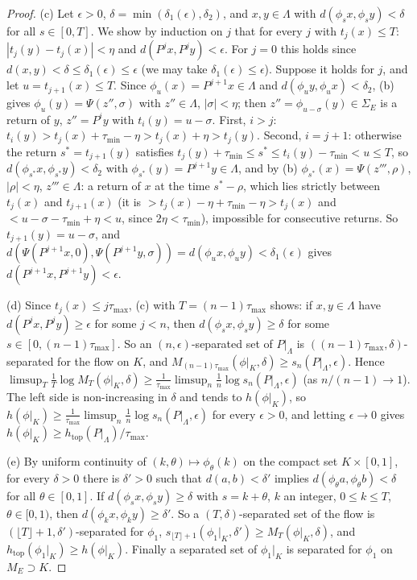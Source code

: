 \documentclass[11pt]{article}
\theoremstyle{definition}
\newcommand{\htop}{h_{\mathrm{top}}}
\begin{document}
\begin{proof}
(c) Let $\epsilon > 0$, $\delta = \min(\delta_1(\epsilon), \delta_2)$, and $x, y \in \Lambda$ with $d(\phi_sx, \phi_sy) < \delta$ for all $s \in [0, T]$. We show by induction on $j$ that for every $j$ with $t_j(x) \le T$: $|t_j(y) - t_j(x)| < \eta$ and $d(P^jx, P^jy) < \epsilon$. For $j = 0$ this holds since $d(x, y) < \delta \le \delta_1(\epsilon) \le \epsilon$ (we may take $\delta_1(\epsilon) \le \epsilon$). Suppose it holds for $j$, and let $u = t_{j+1}(x) \le T$. Since $\phi_u(x) = P^{j+1}x \in \Lambda$ and $d(\phi_uy, \phi_ux) < \delta_2$, (b) gives $\phi_u(y) = \Psi(z'', \sigma)$ with $z'' \in \Lambda$, $|\sigma| < \eta$; then $z'' = \phi_{u - \sigma}(y) \in \Sigma_E$ is a return of $y$, $z'' = P^iy$ with $t_i(y) = u - \sigma$. First, $i > j$: $t_i(y) > t_j(x) + \tau_{\min} - \eta > t_j(x) + \eta > t_j(y)$. Second, $i = j + 1$: otherwise the return $s^* = t_{j+1}(y)$ satisfies $t_j(y) + \tau_{\min} \le s^* \le t_i(y) - \tau_{\min} < u \le T$, so $d(\phi_{s^*}x, \phi_{s^*}y) < \delta_2$ with $\phi_{s^*}(y) = P^{j+1}y \in \Lambda$, and by (b) $\phi_{s^*}(x) = \Psi(z''', \rho)$, $|\rho| < \eta$, $z''' \in \Lambda$: a return of $x$ at the time $s^* - \rho$, which lies strictly between $t_j(x)$ and $t_{j+1}(x)$ (it is $> t_j(x) - \eta + \tau_{\min} - \eta > t_j(x)$ and $< u - \sigma - \tau_{\min} + \eta < u$, since $2\eta < \tau_{\min}$), impossible for consecutive returns. So $t_{j+1}(y) = u - \sigma$, and $d(\Psi(P^{j+1}x, 0), \Psi(P^{j+1}y, \sigma)) = d(\phi_ux, \phi_uy) < \delta_1(\epsilon)$ gives $d(P^{j+1}x, P^{j+1}y) < \epsilon$.

(d) Since $t_j(x) \le j\tau_{\max}$, (c) with $T = (n - 1)\tau_{\max}$ shows: if $x, y \in \Lambda$ have $d(P^jx, P^jy) \ge \epsilon$ for some $j < n$, then $d(\phi_sx, \phi_sy) \ge \delta$ for some $s \in [0, (n-1)\tau_{\max}]$. So an $(n, \epsilon)$-separated set of $P|_\Lambda$ is $((n-1)\tau_{\max}, \delta)$-separated for the flow on $K$, and $M_{(n-1)\tau_{\max}}(\phi|_K, \delta) \ge s_n(P|_\Lambda, \epsilon)$. Hence $\limsup_T\frac1T\log M_T(\phi|_K, \delta) \ge \frac{1}{\tau_{\max}}\limsup_n\frac1n\log s_n(P|_\Lambda, \epsilon)$ (as $n/(n-1) \to 1$). The left side is non-increasing in $\delta$ and tends to $h(\phi|_K)$, so $h(\phi|_K) \ge \frac{1}{\tau_{\max}}\limsup_n\frac1n\log s_n(P|_\Lambda, \epsilon)$ for every $\epsilon > 0$, and letting $\epsilon \to 0$ gives $h(\phi|_K) \ge \htop(P|_\Lambda)/\tau_{\max}$.

(e) By uniform continuity of $(k, \theta) \mapsto \phi_\theta(k)$ on the compact set $K \times [0, 1]$, for every $\delta > 0$ there is $\delta' > 0$ such that $d(a, b) < \delta'$ implies $d(\phi_\theta a, \phi_\theta b) < \delta$ for all $\theta \in [0, 1]$. If $d(\phi_sx, \phi_sy) \ge \delta$ with $s = k + \theta$, $k$ an integer, $0 \le k \le T$, $\theta \in [0, 1)$, then $d(\phi_kx, \phi_ky) \ge \delta'$. So a $(T, \delta)$-separated set of the flow is $(\lfloor T\rfloor + 1, \delta')$-separated for $\phi_1$, $s_{\lfloor T \rfloor + 1}(\phi_1|_K, \delta') \ge M_T(\phi|_K, \delta)$, and $\htop(\phi_1|_K) \ge h(\phi|_K)$. Finally a separated set of $\phi_1|_K$ is separated for $\phi_1$ on $M_E \supset K$.
\end{proof}
\end{document}
